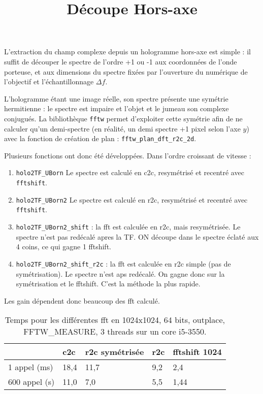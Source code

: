 \documentclass[	french,DIV=calc,paper=a4,fontsize=10pt,
							twocolumn]{scrartcl}	 					%
\title{Découpe Hors-axe}					%
\author{}											%
\date{}																				%
\newcommand{\code}[1]{\texttt{#1}}
\newcommand{\initial}[1]{%
     \lettrine[lines=3,lhang=0.3,nindent=0em]{
     				\color{DarkGoldenrod}
     				{\textsf{#1}}}{}}
\begin{document}
\maketitle
\thispagestyle{fancy} 			%


L'extraction du champ complexe depuis un hologramme hors-axe est simple : il suffit de découper le spectre de l'ordre +1 ou -1 aux coordonnées de l'onde porteuse, et aux dimensions du spectre fixées par l'ouverture du numérique de l'objectif et l'échantillonnage $\Delta f$.

L'hologramme étant une image réelle, son spectre présente une symétrie hermitienne : le spectre est impaire et l'objet et le jumeau son complexe conjugués.  La bibliothèque \code{fftw} 
permet d'exploiter cette symétrie afin de ne calculer qu'un demi-spectre (en réalité, un demi spectre +1 pixel selon l'axe $y$) avec la fonction de création de plan  :   \code{fftw\_plan\_dft\_r2c\_2d}.

Plusieurs fonctions ont donc été développées. Dans l'ordre croissant de vitesse  :
\begin{enumerate}
\item \code{holo2TF\_UBorn} Le spectre est calculé en c2c, resymétrisé et recentré avec \code{fftshift}.
\item \code{holo2TF\_UBorn2} Le spectre est calculé en r2c, resymétrisé et recentré avec \code{fftshift}. 
 \item \code{holo2TF\_UBorn2\_shift} : la fft est calculée en r2c, mais resymétrisée. Le spectre n'est pas redécalé apres la TF. ON découpe dans le spectre éclaté aux 4 coins, ce qui gagne 1 fftshift.
 \item \code{holo2TF\_UBorn2\_shift\_r2c} : la fft est calculée en r2c simple (pas de symétrisation). Le spectre n'est aps redécalé. On gagne donc sur la symétrisation et le fftshift. C'est la méthode la plus rapide.
\end{enumerate}

Les gain dépendent donc beaucoup des fft calculé. 
\begin{table}
 


\begin{center}
\begin{tabular}{|l|l|l|l|l|}\hline
             &c2c & r2c symétrisée & r2c & fftshift 1024\\\hline
1 appel (ms) &18,4 & 11,7 & 9,2 & 2,4\\\hline
600 appel (s)&11,0 & 7,0 & 5,5 & 1,44\\\hline
\end{tabular}
\caption{Temps pour les différentes fft en 1024x1024, 64 bits, outplace, FFTW\_MEASURE, 3 threads sur un core i5-3550.}
\end{center}
\end{table}
\end{document}
